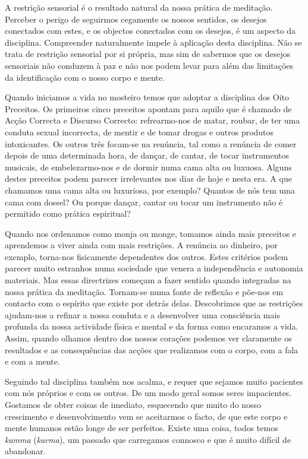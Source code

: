 A restrição sensorial é o resultado natural da nossa prática de
meditação. Perceber o perigo de seguirmos cegamente os nossos sentidos,
os desejos conectados com estes, e os objectos conectados com os
desejos, é um aspecto da disciplina. Compreender naturalmente impele à
aplicação desta disciplina. Não se trata de restrição sensorial por si
própria, mas sim de sabermos que os desejos sensoriais não conduzem à
paz e não nos podem levar para além das limitações da identificação com
o nosso corpo e mente.

Quando iniciamos a vida no mosteiro temos que adoptar a disciplina dos
Oito Preceitos. Os primeiros cinco preceitos apontam para aquilo que é
chamado de Acção Correcta e Discurso Correcto: refrearmo-nos de matar,
roubar, de ter uma conduta sexual incorrecta, de mentir e de tomar
drogas e outros produtos intoxicantes. Os outros três focam-se na
renúncia, tal como a renúncia de comer depois de uma determinada hora,
de dançar, de cantar, de tocar instrumentos musicais, de embelezarmo-nos
e de dormir numa cama alta ou luxuosa. Alguns destes preceitos podem
parecer irrelevantes nos dias de hoje e nesta era. A que chamamos uma
cama alta ou luxuriosa, por exemplo? Quantos de nós tem uma cama com
dossel? Ou porque dançar, cantar ou tocar um instrumento não é permitido
como prática espiritual?

Quando nos ordenamos como monja ou monge, tomamos ainda mais preceitos e
aprendemos a viver ainda com mais restrições. A renúncia ao dinheiro,
por exemplo, torna-nos fisicamente dependentes dos outros. Estes
critérios podem parecer muito estranhos numa sociedade que venera a
independência e autonomia materiais. Mas essas directrizes começam a
fazer sentido quando integradas na nossa prática da meditação. Tornam-se
numa fonte de reflexão e põe-nos em contacto com o espírito que existe
por detrás delas. Descobrimos que as restrições ajudam-nos a refinar a
nossa conduta e a desenvolver uma consciência mais profunda da nossa
actividade física e mental e da forma como encaramos a vida. Assim,
quando olhamos dentro dos nossos corações podemos ver claramente os
resultados e as consequências das acções que realizamos com o corpo, com
a fala e com a mente.

Seguindo tal disciplina também nos acalma, e requer que sejamos muito
pacientes com nós próprios e com os outros. De um modo geral somos seres
impacientes. Gostamos de obter coisas de imediato, esquecendo que muito
do nosso crescimento e desenvolvimento vem se aceitarmos o facto, de que
este corpo e mente humanos estão longe de ser perfeitos. Existe uma
coisa, todos temos \emph{kamma} (\emph{karma}), um passado que
carregamos connosco e que é muito difícil de abandonar.

